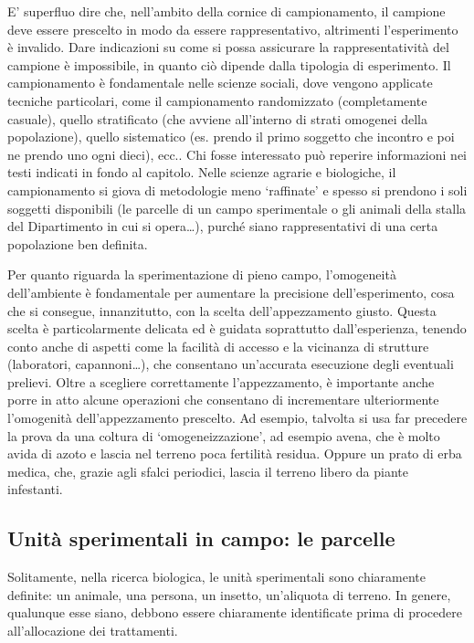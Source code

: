 \documentclass[a4paper,12pt,oneside]{book}
\begin{document}
E' superfluo dire che, nell'ambito della cornice di campionamento, il campione deve essere prescelto in modo da essere rappresentativo, altrimenti l'esperimento è invalido. Dare indicazioni su come si possa assicurare la rappresentatività del campione è impossibile, in quanto ciò dipende dalla tipologia di esperimento. Il campionamento è fondamentale nelle scienze sociali, dove vengono applicate tecniche particolari, come il campionamento randomizzato (completamente casuale), quello stratificato (che avviene all'interno di strati omogenei della popolazione), quello sistematico (es. prendo il primo soggetto che incontro e poi ne prendo uno ogni dieci), ecc.. Chi fosse interessato può reperire informazioni nei testi indicati in fondo al capitolo. Nelle scienze agrarie e biologiche, il campionamento si giova di metodologie meno `raffinate' e spesso si prendono i soli soggetti disponibili (le parcelle di un campo sperimentale o gli animali della stalla del Dipartimento in cui si opera\ldots{}), purché siano rappresentativi di una certa popolazione ben definita.

Per quanto riguarda la sperimentazione di pieno campo, l'omogeneità dell'ambiente è fondamentale per aumentare la precisione dell'esperimento, cosa che si consegue, innanzitutto, con la scelta dell'appezzamento giusto. Questa scelta è particolarmente delicata ed è guidata soprattutto dall'esperienza, tenendo conto anche di aspetti come la facilità di accesso e la vicinanza di strutture (laboratori, capannoni\ldots{}), che consentano un'accurata esecuzione degli eventuali prelievi. Oltre a scegliere correttamente l'appezzamento, è importante anche porre in atto alcune operazioni che consentano di incrementare ulteriormente l'omogenità dell'appezzamento prescelto. Ad esempio, talvolta si usa far precedere la prova da una coltura di `omogeneizzazione', ad esempio avena, che è molto avida di azoto e lascia nel terreno poca fertilità residua. Oppure un prato di erba medica, che, grazie agli sfalci periodici, lascia il terreno libero da piante infestanti.

\hypertarget{unita-sperimentali-in-campo-le-parcelle}{%
\subsection{Unità sperimentali in campo: le parcelle}\label{unita-sperimentali-in-campo-le-parcelle}}

Solitamente, nella ricerca biologica, le unità sperimentali sono chiaramente definite: un animale, una persona, un insetto, un'aliquota di terreno. In genere, qualunque esse siano, debbono essere chiaramente identificate prima di procedere all'allocazione dei trattamenti.
\end{document}
